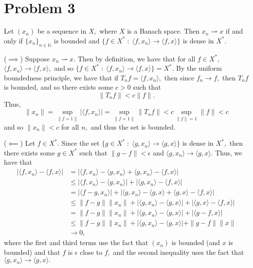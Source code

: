 \documentclass[11pt]{article}
\newcommand{\bbN}{\mathbb{N}}
\begin{document}
\section*{Problem 3}
\begin{problem}
    Let $(x_n)$ be a sequence in $X,$ where $X$ is a Banach space. Then $x_n \rightharpoonup x$ if and only if $\{x_n\}_{n\in \bbN}$ is bounded and $\{f\in X^* \; : \; \langle f, x_n \rangle \to \langle f, x\rangle\}$ is dense in $X^*.$
\end{problem}
\begin{solution}
    ($\implies$) Suppose $x_n \rightharpoonup x.$ Then by definition, we have that for all $f\in X^*,$ $ \langle f, x_n \rangle \to \langle f, x\rangle,$ and so $\{f\in X^* \; : \; \langle f, x_n \rangle \to \langle f, x\rangle\} = X^*.$ By the uniform boundedness principle, we have that if $T_nf = \langle f, x_n \rangle,$ then since $f_n \to f,$ then $T_n f$ is bounded, and so there exists some $c>0$ such that
    \[\|T_n f\|< c\|f\|.\] Thus, 
    \[\|x_n\| = \sup_{\|f = 1\|}|\langle f, x_n \rangle| =\sup_{\|f = 1\|}\|T_n f\| < c \sup_{\|f\| = 1}\|f\|< c\] and so $\|x_n\| < c$ for all $n,$ and thus the set is bounded.

    ($\impliedby$) Let $f\in X^*.$ Since the set $\{g\in X^* \; : \; \langle g, x_n \rangle \to \langle g, x\rangle\}$ is dense in $X^*,$ then there exists some $g\in X^*$ such that $\|g - f\|< \epsilon$ and $\langle g, x_n \rangle \to \langle g, x\rangle.$ Thus, we have that 
    \begin{align*}
    |\langle f, x_n \rangle - \langle f, x\rangle| &= 
    |\langle f, x_n \rangle - \langle g, x_n\rangle + \langle g, x_n\rangle - \langle f, x\rangle|\\
    &\leq |\langle f, x_n \rangle - \langle g, x_n\rangle| + |\langle g, x_n\rangle - \langle f, x\rangle|\\
    &= |\langle f - g, x_n \rangle| + |\langle g, x_n\rangle - \langle g, x \rangle + \langle g, x \rangle - \langle f, x\rangle|\\
    &\leq \|f - g\|\|x_n\| + |\langle g, x_n\rangle - \langle g, x \rangle| + |\langle g, x\rangle - \langle f, x\rangle|\\
    &= \|f - g\|\|x_n\| + |\langle g, x_n\rangle - \langle g, x \rangle| + |\langle g-f, x\rangle|\\
    &\leq \|f - g\|\|x_n\| +|\langle g, x_n\rangle - \langle g, x \rangle|+ \|g-f\| \|x\|\\
    &\to 0,
    \end{align*}
    where the first and third terms use the fact that $(x_n)$ is bounded (and $x$ is bounded) and that $f$ is $\epsilon$ close to $f,$ and the second inequality uses the fact that $\langle g, x_n \rangle \to \langle g, x\rangle.$
\end{solution}
\end{document}
